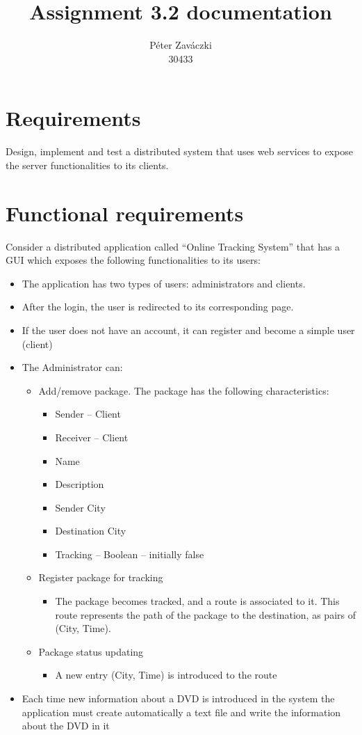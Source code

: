 \documentclass[a4paper,10pt]{report}
\title{Assignment 3.2 documentation}
\author{Péter Zaváczki\\30433}
\begin{document}
\maketitle

\section{Requirements}
Design, implement and test a distributed system that uses web services to expose the server
functionalities to its clients.

\section{Functional requirements}
Consider a distributed application called “Online Tracking System” that has a GUI which exposes the following functionalities to its users:
\begin{itemize}
    \item The application has two types of users: administrators and clients.
    \item After the login, the user is redirected to its corresponding page.
    \item If the user does not have an account, it can register and become a simple user (client)
    \item The Administrator can:
    \begin{itemize}
        \item Add/remove package. The package has the following characteristics:
        \begin{itemize}
            \item Sender – Client
            \item Receiver – Client
            \item Name
            \item Description
            \item Sender City
            \item Destination City
            \item Tracking – Boolean – initially false
        \end{itemize}
        \item Register package for tracking
        \begin{itemize}
            \item The package becomes tracked, and a route is associated to it. This route represents the path of the package to the destination, as pairs of (City, Time).
        \end{itemize}
        \item Package status updating
        \begin{itemize}
            \item A new entry (City, Time) is introduced to the route
        \end{itemize}
    \end{itemize}
    \item Each time new information about a DVD is introduced in the system the application must create automatically a text file and write the information about the DVD in it    
\end{itemize}
\end{document}
